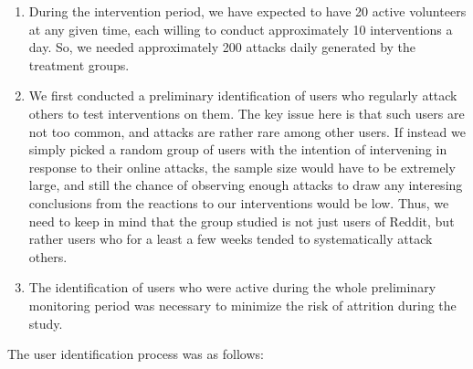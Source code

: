\documentclass[preprint,12pt]{elsarticle}
\begin{document}
\renewcommand{\labelenumii}{\Roman{enumii}}
 \begin{enumerate}
 \item During the intervention period, we have expected to have 20 active volunteers at any given time, each willing to conduct approximately 10 interventions a day.  So, we needed approximately 200 attacks daily generated by the treatment groups.
\item We first conducted a preliminary identification of users who regularly attack others to test interventions on them. The key issue here is that such users are not too common, and attacks are rather rare among other users. If instead we simply picked a random group of users with the intention of intervening in response to their online attacks, the sample size would have to be extremely large, and still the chance of observing enough attacks to draw any interesing conclusions from the reactions to our interventions would be low. Thus, we need to keep in mind that the group studied is not just users of Reddit, but rather users who for a least a few weeks tended to systematically attack others.

\item The identification of users who were active during the whole preliminary monitoring period was necessary to minimize the risk of attrition during the study. 
 \end{enumerate}

\noindent The user identification process was as follows:
\end{document}
